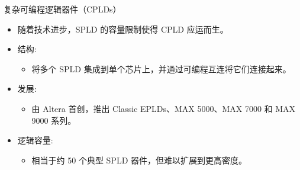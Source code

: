 \begin{frame}{复杂可编程逻辑器件（CPLDs）}
\begin{itemize}
\tightlist
\item
    随着技术进步，SPLD 的容量限制使得 CPLD 应运而生。
\item
    结构:

    \begin{itemize}
    \tightlist
    \item
    将多个 SPLD 集成到单个芯片上，并通过可编程互连将它们连接起来。
    \end{itemize}
\item
    发展:

    \begin{itemize}
    \tightlist
    \item
    由 Altera 首创，推出 Classic EPLDs、MAX 5000、MAX 7000 和 MAX 9000
    系列。
    \end{itemize}
\item
    逻辑容量:

    \begin{itemize}
    \tightlist
    \item
    相当于约 50 个典型 SPLD 器件，但难以扩展到更高密度。
    \end{itemize}
\end{itemize}
\end{frame}

